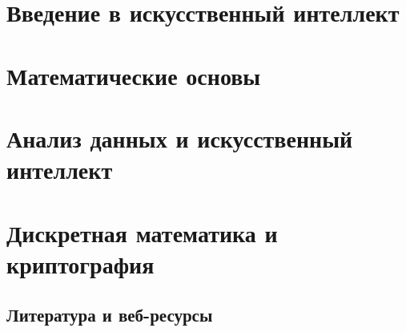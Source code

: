 \documentclass[11pt, openany, twoside]{book}
\begin{document}
\part{Введение в искусственный интеллект}


\part{Математические основы}



\part{Анализ данных и искусственный интеллект}


\part{Дискретная математика и криптография}


\backmatter
\chapter*{Литература и веб-ресурсы}
\end{document}
